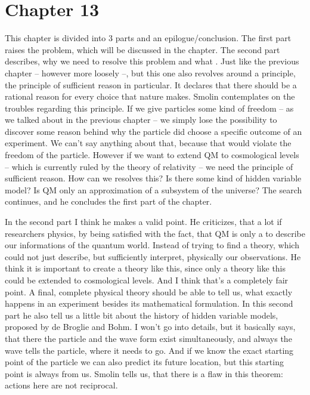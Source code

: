 \section{Chapter 13}
This chapter is divided into 3 parts and an epilogue/conclusion. The first part raises the problem, which will be discussed in the chapter. The second part describes, why we need to resolve this problem and what . Just like the previous chapter -- however more loosely --, but this one also revolves around a principle, the principle of sufficient reason in particular. It declares that there should be a rational reason for every choice that nature makes. Smolin contemplates on the troubles regarding this principle. If we give particles some kind of freedom -- as we talked about in the previous chapter -- we simply lose the possibility to discover some reason behind why the particle did choose a specific outcome of an experiment. We can't say anything about that, because that would violate the freedom of the particle. However if we want to extend QM to cosmological levels -- which is currently ruled by the theory of relativity -- we need the principle of sufficient reason. How can we resolves this? Is there some kind of hidden variable model? Is QM only an approximation of a subsystem of the universe? The search continues, and he concludes the first part of the chapter. \par
In the second part I think he makes a valid point. He criticizes, that a lot if researchers  physics, by being satisfied with the fact, that QM is only a  to describe our informations of the quantum world. Instead of trying to find a theory, which could not just describe, but sufficiently interpret, physically our observations. He think it is important to create a theory like this, since only a theory like this could be extended to cosmological levels. And I think that's a completely fair point. A final, complete physical theory should be able to tell us, what exactly happens in an experiment besides its mathematical formulation. \newline
In this second part he also tell us a little bit about the history of hidden variable models, proposed by de Broglie and Bohm. I won't go into details, but it basically says, that there the particle and the wave form exist simultaneously, and always the wave tells the particle, where it needs to go. And if we know the exact starting point of the particle we can also predict its future location, but this starting point is always  from us. Smolin tells us, that there is a flaw in this theorem: actions here are not reciprocal. \par
